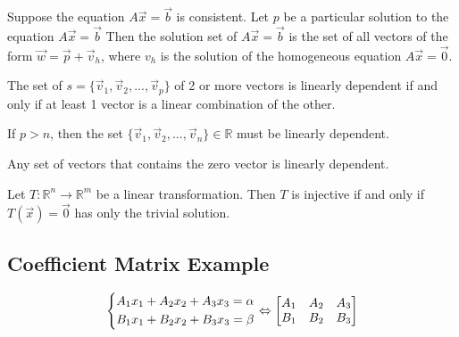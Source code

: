 \documentclass[5pt]{article}
\begin{document}
\begin{multicols}{2}
\begin{theorem}
  Suppose the equation $A\vec{x}=\vec{b}$ is consistent. Let $p$ be a particular solution to the equation $A\vec{x}=\vec{b}$ 
  Then the solution set of $A\vec{x}=\vec{b}$ is the set of all vectors of the form $\vec{w}=\vec{p}+\vec{v}_h$,
  where $v_h$ is the solution of the homogeneous equation $A\vec{x}=\vec{0}$.
\end{theorem}

\begin{theorem}
  The set of  $s=\{\vec{v}_1,\vec{v}_2, ... ,\vec{v}_p\}$ of 2 or more vectors 
  is linearly dependent if and only if at least 1 vector is a linear combination 
  of the other.
\end{theorem}

\begin{theorem}
  If $p>n$, then the set $\{\vec{v}_1, \vec{v}_2, ..., \vec{v}_n\}\in\mathbb{R}$ 
  must be linearly dependent.
\end{theorem}

\begin{theorem}
  Any set of vectors that contains the zero vector is linearly dependent.
\end{theorem}

\begin{theorem}
  Let $T:\mathbb{R}^n\rightarrow\mathbb{R}^m$ be a linear transformation. Then $T$ 
  is injective if and only if $T(\vec{x})=\vec{0}$ has only the trivial solution.
\end{theorem}

\subsection{Coefficient Matrix Example}
\begin{equation}
\centering
\left\{\begin{split}
A_1x_1+A_2x_2+A_3x_3=\alpha \\
B_1x_1+B_2x_2+B_3x_3=\beta \\
\end{split}\right.
\Leftrightarrow
\begin{bmatrix}
    A_1 & A_2 & A_3\\
    B_1 & B_2 & B_3\\
\end{bmatrix}
\end{equation}


\end{multicols}
\end{document}
